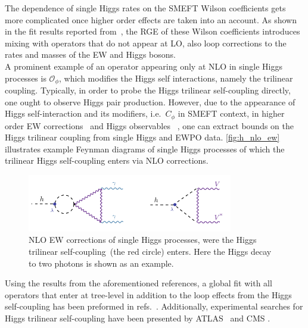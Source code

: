 The dependence of single Higgs rates on the SMEFT Wilson coefficients gets more complicated once higher order effects are taken into an account. As shown in the fit results reported from~\cite{Dawson:2020oco}, the RGE of these Wilson coefficients introduces mixing with operators that do not appear at LO, also loop corrections to the rates and masses of the EW and Higgs bosons. \\A prominent example of an operator appearing only at NLO in single Higgs processes is $\mathcal O_\phi$, which modifies the Higgs self interactions, namely the trilinear coupling. 
Typically, in order to probe the Higgs trilinear self-coupling directly, one ought to observe Higgs pair production. However, due to the appearance of Higgs self-interaction and its modifiers, i.e.~$C_\phi$ in SMEFT context, in higher order EW corrections~\cite{Degrassi:2014sxa,Kribs:2017znd} and Higgs observables~ \cite{McCullough:2013rea, Gorbahn:2016uoy, Degrassi:2016wml, Bizon:2016wgr, Maltoni:2017ims, Degrassi:2019yix, Degrassi:2021uik, Haisch:2021hvy}, one can extract bounds on the Higgs trilinear coupling from single Higgs and EWPO data. \autoref{fig:h_nlo_ew} illustrates  example Feynman diagrams of single Higgs processes of which the trilinear Higgs self-coupling enters via NLO corrections.
\begin{figure}[htpb!]
	\begin{center}
		\includegraphics[width=0.8\textwidth]{figures/htoaa_nlo_ew}
		\caption{NLO EW corrections of single Higgs processes,  were the Higgs trilinear self-coupling~(the red circle) enters. Here the Higgs decay to two photons is shown as an example. \label{fig:h_nlo_ew} }
	\end{center}
\end{figure}
Using the results from the aforementioned references, a global fit with all operators that enter at tree-level in addition to the loop effects from the Higgs self-coupling has been preformed in refs.~\cite{DiVita:2017eyz,Dawson:2020oco}. Additionally, experimental searches for Higgs trilinear self-coupling have been presented by ATLAS~\cite{ATLAS:2019pbo} and CMS \cite{CMS:2020gsy}. 
